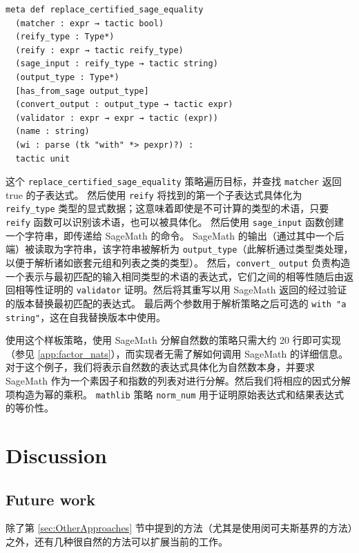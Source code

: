 \documentclass[sigplan,10pt,nonacm,
screen]{acmart} \settopmatter{printfolios=true,printccs=false,printacmref=false}
\newcommand{\mathlib}{\lstinline{mathlib}\xspace}
\begin{document}
\begin{lstlisting}
meta def replace_certified_sage_equality
  (matcher : expr → tactic bool)
  (reify_type : Type*)
  (reify : expr → tactic reify_type)
  (sage_input : reify_type → tactic string)
  (output_type : Type*)
  [has_from_sage output_type]
  (convert_output : output_type → tactic expr)
  (validator : expr → expr → tactic (expr))
  (name : string)
  (wi : parse (tk "with" *> pexpr)?) :
  tactic unit
\end{lstlisting}
这个 \lstinline{replace_certified_sage_equality} 策略遍历目标，并查找 \lstinline{matcher} 返回 true 的子表达式。
然后使用 \lstinline{reify} 将找到的第一个子表达式具体化为 \lstinline{reify_type} 类型的显式数据；这意味着即使是不可计算的类型的术语，只要 \lstinline{reify} 函数可以识别该术语，也可以被具体化。
%
然后使用 \lstinline{sage_input} 函数创建一个字符串，即传递给 SageMath 的命令。
SageMath 的输出（通过其中一个后端）被读取为字符串，该字符串被解析为 \lstinline{output_type}（此解析通过类型类处理，以便于解析诸如嵌套元组和列表之类的类型）。
%
然后，\lstinline{convert_}\-%
\lstinline{output} 负责构造一个表示与最初匹配的输入相同类型的术语的表达式，它们之间的相等性随后由返回相等性证明的 \lstinline{validator} 证明。然后将其重写以用 SageMath 返回的经过验证的版本替换最初匹配的表达式。
%
最后两个参数用于解析策略之后可选的 \lstinline{with "a string"}，这在自我替换版本中使用。

使用这个样板策略，使用 SageMath 分解自然数的策略只需大约 20 行即可实现（参见 \cref{app:factor_nats}），而实现者无需了解如何调用 SageMath 的详细信息。
对于这个例子，我们将表示自然数的表达式具体化为自然数本身，并要求 SageMath 作为一个素因子和指数的列表对进行分解。然后我们将相应的因式分解项构造为幂的乘积。
\mathlib 策略 \lstinline{norm_num} 用于证明原始表达式和结果表达式的等价性。



\section{Discussion}

\subsection{Future work}\label{sec:Future}

除了第 \ref{sec:OtherApproaches} 节中提到的方法（尤其是使用闵可夫斯基界的方法）之外，还有几种很自然的方法可以扩展当前的工作。
\end{document}
